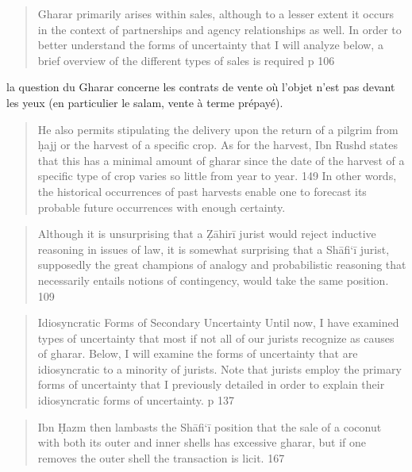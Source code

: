  \begin{quote}
     Gharar primarily arises within sales, although to a lesser extent it occurs in the
context of partnerships and agency relationships as well. In order to better understand the
forms of uncertainty that I will analyze below, a brief overview of the different types of
sales is required p 106
 \end{quote}
 
 la question du Gharar concerne les contrats de vente où l'objet n'est pas devant les yeux (en particulier le salam, vente à terme prépayé).
 
 \begin{quote}
     He also permits stipulating the delivery upon the
return of a pilgrim from ḥajj or the harvest of a specific crop. As for the harvest, Ibn
Rushd states that this has a minimal amount of gharar since the date of the harvest of a
specific type of crop varies so little from year to year. 149 In other words, the historical
occurrences of past harvests enable one to forecast its probable future occurrences with
enough certainty.
 \end{quote}
 
 \begin{quote}
     Although it is unsurprising that a Ẓāhirī
jurist would reject inductive reasoning in issues of law, it is somewhat surprising that a
Shāfi‘ī jurist, supposedly the great champions of analogy and probabilistic reasoning
that necessarily entails notions of contingency, would take the same position. 109
 \end{quote}
 
 \begin{quote}
     Idiosyncratic Forms of Secondary Uncertainty
Until now, I have examined types of uncertainty that most if not all of our jurists
recognize as causes of gharar. Below, I will examine the forms of uncertainty that are
idiosyncratic to a minority of jurists. Note that jurists employ the primary forms of
uncertainty that I previously detailed in order to explain their idiosyncratic forms of
uncertainty. p 137
 \end{quote}
 
 \begin{quote}
     Ibn Ḥazm then lambasts the Shāfi‘ī position that the sale of a coconut with both
its outer and inner shells has excessive gharar, but if one removes the outer shell the
transaction is licit. 167
 \end{quote}
 

